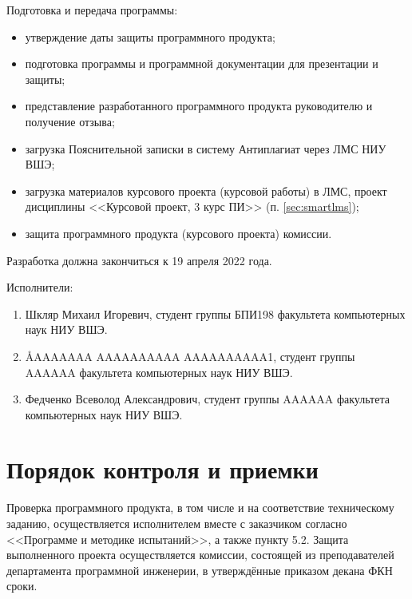 \documentclass[a4paper,12pt,reqno]{article}
\begin{document}
  Подготовка и передача программы:
  \begin{itemize}
    \item утверждение даты защиты программного продукта;
    \item подготовка программы и программной документации для презентации и защиты;
    \item представление разработанного программного продукта руководителю и получение отзыва;
    \item загрузка Пояснительной записки в систему Антиплагиат через ЛМС НИУ ВШЭ;
    \item загрузка материалов курсового проекта (курсовой работы) в ЛМС, проект дисциплины <<Курсовой проект, 3 курс ПИ>> (п. \ref{sec:smartlms});
    \item защита программного продукта (курсового проекта) комиссии.
  \end{itemize}
  Разработка должна закончиться к 19 апреля 2022 года.

  Исполнители:
  \begin{enumerate}
    \item Шкляр Михаил Игоревич, студент группы БПИ198 факультета компьютерных наук НИУ ВШЭ.
    \item \AA{AAAAAAA AAAAAAAAAA AAAAAAAAAA}{1}, студент группы AAAAAA факультета компьютерных наук НИУ ВШЭ.
    \item Федченко Всеволод Александрович, студент группы AAAAAA факультета компьютерных наук НИУ ВШЭ.
  \end{enumerate}

  \section{Порядок контроля и приемки}
  Проверка программного продукта, в том числе и на соответствие техническому заданию,
  осуществляется исполнителем вместе с заказчиком согласно <<Программе и методике испытаний>>, а также пункту 5.2.
  Защита выполненного проекта осуществляется комиссии, состоящей из преподавателей департамента программной инженерии,
  в утверждённые приказом декана ФКН сроки.

  \begin{CRTbibliography}
  \end{CRTbibliography}

  \CRTlistRegistration
\end{document}
